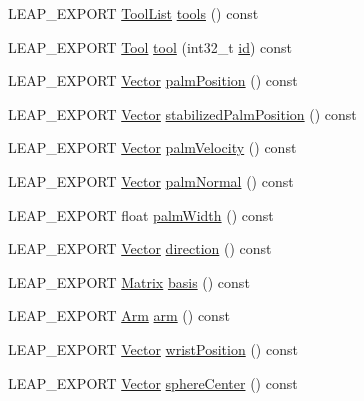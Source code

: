 \begin{DoxyCompactItemize}
\item 
L\+E\+A\+P\+\_\+\+E\+X\+P\+O\+RT \hyperlink{class_leap_1_1_tool_list}{Tool\+List} \hyperlink{class_leap_1_1_hand_a715c211881d94e441eab3110b5075a0f}{tools} () const
\item 
L\+E\+A\+P\+\_\+\+E\+X\+P\+O\+RT \hyperlink{class_leap_1_1_tool}{Tool} \hyperlink{class_leap_1_1_hand_a1d66d728af5d56f6021ab62090c8c77d}{tool} (int32\+\_\+t \hyperlink{class_leap_1_1_hand_a8ef8fb5d06e31b5aa3cc19548d3af205}{id}) const
\item 
L\+E\+A\+P\+\_\+\+E\+X\+P\+O\+RT \hyperlink{struct_leap_1_1_vector}{Vector} \hyperlink{class_leap_1_1_hand_a4c5037d0f2bdad73d2ba31f8a5b53e67}{palm\+Position} () const
\item 
L\+E\+A\+P\+\_\+\+E\+X\+P\+O\+RT \hyperlink{struct_leap_1_1_vector}{Vector} \hyperlink{class_leap_1_1_hand_acc0aa1360411dee646658fed75b056cf}{stabilized\+Palm\+Position} () const
\item 
L\+E\+A\+P\+\_\+\+E\+X\+P\+O\+RT \hyperlink{struct_leap_1_1_vector}{Vector} \hyperlink{class_leap_1_1_hand_a33dfe22cc108e346acc6ebcacebd122f}{palm\+Velocity} () const
\item 
L\+E\+A\+P\+\_\+\+E\+X\+P\+O\+RT \hyperlink{struct_leap_1_1_vector}{Vector} \hyperlink{class_leap_1_1_hand_ae47ff36b818f724db2f139a6e3fa0eb3}{palm\+Normal} () const
\item 
L\+E\+A\+P\+\_\+\+E\+X\+P\+O\+RT float \hyperlink{class_leap_1_1_hand_ab9ed5affee0cc08226a3d334341b0496}{palm\+Width} () const
\item 
L\+E\+A\+P\+\_\+\+E\+X\+P\+O\+RT \hyperlink{struct_leap_1_1_vector}{Vector} \hyperlink{class_leap_1_1_hand_a71e62bf83996e26ccd497dd70803b46b}{direction} () const
\item 
L\+E\+A\+P\+\_\+\+E\+X\+P\+O\+RT \hyperlink{struct_leap_1_1_matrix}{Matrix} \hyperlink{class_leap_1_1_hand_a967f114a0f3b394eb7e17777dcc06334}{basis} () const
\item 
L\+E\+A\+P\+\_\+\+E\+X\+P\+O\+RT \hyperlink{class_leap_1_1_arm}{Arm} \hyperlink{class_leap_1_1_hand_a6844547eb4a7ff6193fb0a052be93401}{arm} () const
\item 
L\+E\+A\+P\+\_\+\+E\+X\+P\+O\+RT \hyperlink{struct_leap_1_1_vector}{Vector} \hyperlink{class_leap_1_1_hand_a6b5b9a08f5fe21d3eb1b1ab43dcec817}{wrist\+Position} () const
\item 
L\+E\+A\+P\+\_\+\+E\+X\+P\+O\+RT \hyperlink{struct_leap_1_1_vector}{Vector} \hyperlink{class_leap_1_1_hand_aede162c1102ca6acf796f4735044ce10}{sphere\+Center} () const
\item 

\end{DoxyCompactItemize}
